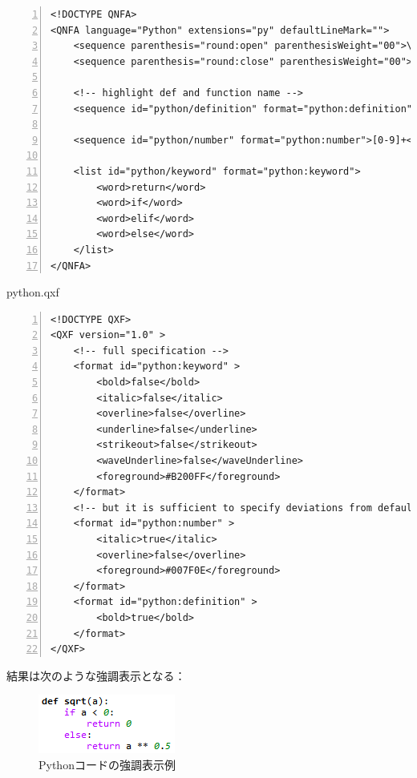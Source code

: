 \begin{lstlisting}[frame=single,breaklines=true,numbers=left]
<!DOCTYPE QNFA>
<QNFA language="Python" extensions="py" defaultLineMark="">
    <sequence parenthesis="round:open" parenthesisWeight="00">\(</sequence>
    <sequence parenthesis="round:close" parenthesisWeight="00">\)</sequence>

    <!-- highlight def and function name -->
    <sequence id="python/definition" format="python:definition">def$s?$w*</sequence>

    <sequence id="python/number" format="python:number">[0-9]+</sequence>

    <list id="python/keyword" format="python:keyword">
        <word>return</word>
        <word>if</word>
        <word>elif</word>
        <word>else</word>
    </list>
</QNFA>
\end{lstlisting}

python.qxf

\begin{lstlisting}[frame=single,breaklines=true,numbers=left]
<!DOCTYPE QXF>
<QXF version="1.0" >
    <!-- full specification -->
    <format id="python:keyword" >
        <bold>false</bold>
        <italic>false</italic>
        <overline>false</overline>
        <underline>false</underline>
        <strikeout>false</strikeout>
        <waveUnderline>false</waveUnderline>
        <foreground>#B200FF</foreground>
    </format>
    <!-- but it is sufficient to specify deviations from default -->
    <format id="python:number" >
        <italic>true</italic>
        <overline>false</overline>
        <foreground>#007F0E</foreground>
    </format>
    <format id="python:definition" >
        <bold>true</bold>
    </format>
</QXF>
\end{lstlisting}

結果は次のような強調表示となる：

\begin{figure}[H]
  \centering
  \includegraphics{format_example.png}
  \caption{Pythonコードの強調表示例}
\end{figure}

